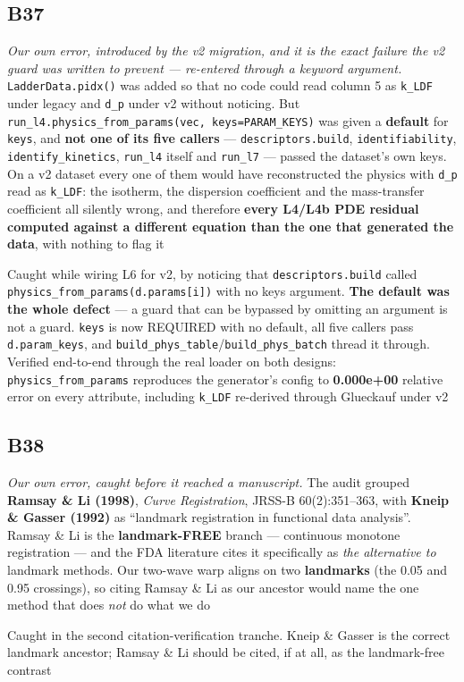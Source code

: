 \documentclass[10pt]{article}
\begin{document}
\subsection*{B37}\label{led:B37}
\begin{description}[leftmargin=0pt,itemsep=1pt]
\item[Defect.] \emph{Our own error, introduced by the v2 migration, and it is the exact failure the v2 guard was written to prevent --- re-entered through a keyword argument.} \texttt{LadderData.pidx()} was added so that no code could read column 5 as \texttt{k\_LDF} under legacy and \texttt{d\_p} under v2 without noticing. But \texttt{run\_l4.physics\_from\_params(vec, keys=PARAM\_KEYS)} was given a \textbf{default} for \texttt{keys}, and \textbf{not one of its five callers} --- \texttt{descriptors.build}, \texttt{identifiability}, \texttt{identify\_kinetics}, \texttt{run\_l4} itself and \texttt{run\_l7} --- passed the dataset's own keys. On a v2 dataset every one of them would have reconstructed the physics with \texttt{d\_p} read as \texttt{k\_LDF}: the isotherm, the dispersion coefficient and the mass-transfer coefficient all silently wrong, and therefore \textbf{every L4/L4b PDE residual computed against a different equation than the one that generated the data}, with nothing to flag it
\item[How it was caught.] Caught while wiring L6 for v2, by noticing that \texttt{descriptors.build} called \texttt{physics\_from\_params(d.params[i])} with no keys argument. \textbf{The default was the whole defect} --- a guard that can be bypassed by omitting an argument is not a guard. \texttt{keys} is now REQUIRED with no default, all five callers pass \texttt{d.param\_keys}, and \texttt{build\_phys\_table}/\texttt{build\_phys\_batch} thread it through. Verified end-to-end through the real loader on both designs: \texttt{physics\_from\_params} reproduces the generator's config to \textbf{0.000e+00} relative error on every attribute, including \texttt{k\_LDF} re-derived through Glueckauf under v2
\end{description}
\subsection*{B38}\label{led:B38}
\begin{description}[leftmargin=0pt,itemsep=1pt]
\item[Defect.] \emph{Our own error, caught before it reached a manuscript.} The audit grouped \textbf{Ramsay \& Li (1998)}, \emph{Curve Registration}, JRSS-B 60(2):351--363, with \textbf{Kneip \& Gasser (1992)} as ``landmark registration in functional data analysis''. Ramsay \& Li is the \textbf{landmark-FREE} branch --- continuous monotone registration --- and the FDA literature cites it specifically as \emph{the alternative to} landmark methods. Our two-wave warp aligns on two \textbf{landmarks} (the 0.05 and 0.95 crossings), so citing Ramsay \& Li as our ancestor would name the one method that does \emph{not} do what we do
\item[How it was caught.] Caught in the second citation-verification tranche. Kneip \& Gasser is the correct landmark ancestor; Ramsay \& Li should be cited, if at all, as the landmark-free contrast
\end{description}
\end{document}
